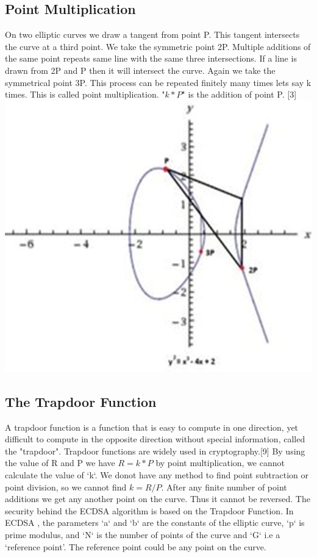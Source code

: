 \documentclass{report}
\begin{document}
\subsection{Point Multiplication}
On two elliptic curves we draw a tangent from point P. This tangent intersects the curve at a third point. We take the symmetric point 2P. Multiple additions of the same point repeats same line with the same three intersections.
If a line is drawn from 2P and P then it will intersect the curve. Again we take the symmetrical point 3P. This process can be repeated finitely many times lets say k times. This is called point multiplication. "$k*P$" is the addition of point P.
[3]\\
\includegraphics[scale=0.25]{pointmutiply.png}
\subsection{The Trapdoor Function}
A trapdoor function\cite{wiki:xxx}  is a function that is easy to compute in one direction, yet difficult to compute in the opposite direction without special information, called the "trapdoor". Trapdoor functions are widely used in cryptography.[9]
By using the value of R and P we have $R = k*P$ by point multiplication, we cannot calculate the value of ‘k‘. We donot have any method to find point subtraction or point division, so we cannot find $k = R/P$. After any finite number of point additions we get any another point on the curve. Thus it cannot be reversed.
The security behind the ECDSA algorithm is based on the Trapdoor Function.
In ECDSA \cite{schmid2015ecdsa}, the parameters ‘a‘ and ‘b‘ are the constants of the elliptic curve, ‘p‘ is prime modulus, and ‘N‘ is the number of points of the curve and ‘G‘ i.e a ‘reference point’. The reference point could be any point on the curve.
\end{document}
